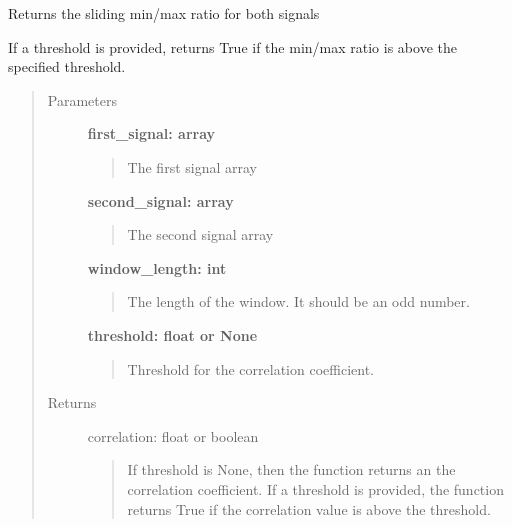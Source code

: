 \documentclass[letterpaper,10pt,english]{sphinxmanual}
\begin{document}

\begin{fulllineitems}
\label{fit_checks:fit_checks.sliding_check_min_max_ratio}
Returns the sliding min/max ratio for both signals

If a threshold is provided, returns True if
the min/max ratio is above the specified threshold.
\begin{quote}\begin{description}
\item[{Parameters}] \leavevmode
\textbf{first\_signal: array}
\begin{quote}

The first signal array
\end{quote}

\textbf{second\_signal: array}
\begin{quote}

The second signal array
\end{quote}

\textbf{window\_length: int}
\begin{quote}

The length of the window. It should be an odd number.
\end{quote}

\textbf{threshold: float or None}
\begin{quote}

Threshold for the correlation coefficient.
\end{quote}

\item[{Returns}] \leavevmode
correlation: float or boolean
\begin{quote}

If threshold is None, then the function returns an the correlation coefficient.
If a threshold is provided, the function returns True if the correlation value is
above the threshold.
\end{quote}

\end{description}\end{quote}

\end{fulllineitems}

\end{document}
